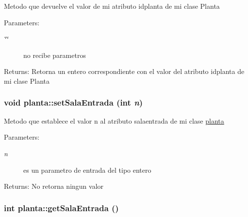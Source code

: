 Metodo que devuelve el valor de mi atributo idplanta de mi clase Planta \begin{Desc}
\item[Parameters:]
\begin{description}
\item[{\em \char`\"{}\char`\"{}}]no recibe parametros \end{description}
\end{Desc}
\begin{Desc}
\item[Returns:]Retorna un entero correspondiente con el valor del atributo idplanta de mi clase Planta \end{Desc}
\hypertarget{classplanta_b322da5e5360a302601c15c98748213c}{
\subsubsection[setSalaEntrada]{\setlength{\rightskip}{0pt plus 5cm}void planta::setSalaEntrada (int {\em n})}}
\label{classplanta_b322da5e5360a302601c15c98748213c}


Metodo que establece el valor n al atributo salaentrada de mi clase \hyperlink{classplanta}{planta} \begin{Desc}
\item[Parameters:]
\begin{description}
\item[{\em n}]es un parametro de entrada del tipo entero \end{description}
\end{Desc}
\begin{Desc}
\item[Returns:]No retorna ningun valor \end{Desc}
\hypertarget{classplanta_9ea0125af87508895b27bc0c2235e42a}{
\subsubsection[getSalaEntrada]{\setlength{\rightskip}{0pt plus 5cm}int planta::getSalaEntrada ()}}
\label{classplanta_9ea0125af87508895b27bc0c2235e42a}


